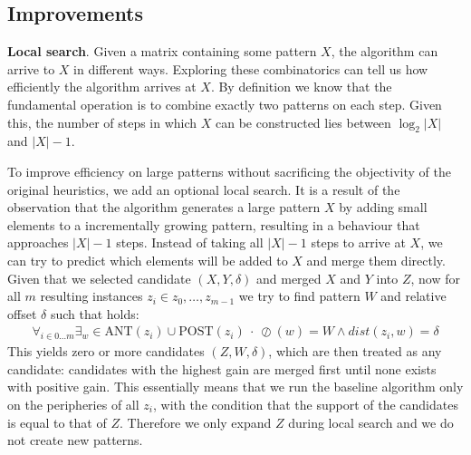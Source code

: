 \documentclass{llncs}
\begin{document}
\subsection{Improvements}
\label{improvements}
\noindent \textbf{Local search}. Given a matrix containing some pattern $X$, the algorithm can arrive to $X$ in different ways. Exploring these combinatorics can tell us how efficiently the algorithm arrives at $X$. By definition we know that the fundamental operation is to combine exactly two patterns on each step. Given this, the number of steps in which $X$ can be constructed lies between $\log_2|X|$ and $|X|-1$. 



To improve efficiency on large patterns without sacrificing the objectivity of the original heuristics, we add an optional local search. It is a result of the observation that the algorithm generates a large pattern $X$ by adding small elements to a incrementally growing pattern, resulting in a behaviour that approaches $|X|-1$ steps. Instead of taking all $|X|-1$ steps to arrive at $X$, we can try to predict which elements will be added to $X$ and merge them directly. Given that we selected candidate $(X,Y,\delta)$ and merged $X$ and $Y$ into $Z$, now for all $m$ resulting instances $z_i \in {z_0,\dots,z_{m-1}}$ we try to find pattern $W$ and relative offset $\delta$ such that holds:
\begin{align}
\label{floodfill}
\forall_{i\in 0\dots m} \exists_w \in \mathrm{ANT}(z_i) \cup \mathrm{POST}(z_i) \ \cdot \ \oslash(w) = W \land dist(z_i, w) = \delta 
\end{align}
\noindent This yields zero or more candidates $(Z,W,\delta)$, which are then treated as any candidate: candidates with the highest gain are merged first until none exists with positive gain. This essentially means that we run the baseline algorithm only on the peripheries of all $z_i$, with the condition that the support of the candidates is equal to that of $Z$. Therefore we only expand $Z$ during local search and we do not create new patterns. 
\end{document}
